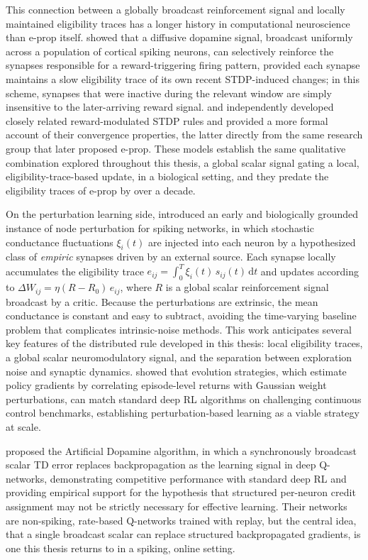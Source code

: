 This connection between a globally broadcast reinforcement signal and
locally maintained eligibility traces has a longer history in
computational neuroscience than e-prop itself.
\citep{Izhikevich2007DistalReward} showed that a diffusive dopamine
signal, broadcast uniformly across a population of cortical spiking
neurons, can selectively reinforce the synapses responsible for a
reward-triggering firing pattern, provided each synapse maintains a slow
eligibility trace of its own recent STDP-induced changes; in this scheme,
synapses that were inactive during the relevant window are simply
insensitive to the later-arriving reward signal.
\citep{Florian2007RewardSTDP} and \citep{Legenstein2008RewardSTDP} independently developed closely related
reward-modulated STDP rules and provided a more formal account of their
convergence properties, the latter directly from the same research group
that later proposed e-prop. These models establish the same qualitative
combination explored throughout this thesis, a global scalar signal
gating a local, eligibility-trace-based update, in a biological setting, and they predate the eligibility traces of
e-prop by over a decade.

On the perturbation learning side, \citet{fiete2006gradient} introduced an early and
biologically grounded instance of node perturbation for spiking networks, in which
stochastic conductance fluctuations $\xi_i(t)$ are injected into each neuron by a
hypothesized class of \emph{empiric} synapses driven by an external source. Each
synapse locally accumulates the eligibility trace $e_{ij} = \int_0^T \xi_i(t)\,
s_{ij}(t)\,\mathrm{d}t$ and updates according to $\Delta W_{ij} = \eta(R -
R_0)\,e_{ij}$, where $R$ is a global scalar reinforcement signal broadcast by a
critic. Because the perturbations are extrinsic, the mean conductance is constant and easy to subtract, avoiding the
time-varying baseline problem that complicates intrinsic-noise methods. This work
anticipates several key features of the distributed rule developed in this thesis:
local eligibility traces, a global scalar neuromodulatory signal, and the separation
between exploration noise and synaptic dynamics.
\citet{salimans2017evolutionstrategiesscalablealternative} showed that evolution
strategies, which estimate policy gradients by correlating episode-level returns with
Gaussian weight perturbations, can match standard deep RL algorithms on challenging
continuous control benchmarks, establishing perturbation-based learning as a viable
strategy at scale.

\citep{guan2024artificialdopamine} proposed the Artificial Dopamine
algorithm, in which a synchronously broadcast scalar TD error replaces
backpropagation as the learning signal in deep Q-networks, demonstrating
competitive performance with standard deep RL and providing empirical
support for the hypothesis that structured per-neuron credit assignment
may not be strictly necessary for effective learning. Their networks are
non-spiking, rate-based Q-networks trained with replay, but the central idea, that a single broadcast scalar can replace
structured backpropagated gradients, is one this thesis returns to in a
spiking, online setting.


